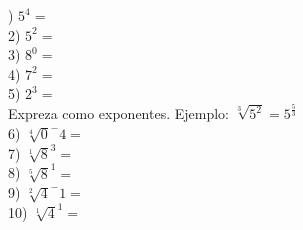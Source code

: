 \documentclass[a4paper,12pt]{article}
\begin{document}
 ) $5^4=$\vspace{1cm}\\ 
2) $5^2=$\vspace{1cm}\\ 
3) $8^0=$\vspace{1cm}\\ 
4) $7^2=$\vspace{1cm}\\ 
5) $2^3=$\vspace{1cm}\\ 
 Expreza como exponentes.
 Ejemplo: $\sqrt[3]{5^2}=5^\frac{5}{3} $  \vspace{0.5cm}\\ 
6) $\sqrt[4]{0}^-4=$\vspace{1cm}\\ 
7) $\sqrt[1]{8}^3=$\vspace{1cm}\\ 
8) $\sqrt[5]{8}^1=$\vspace{1cm}\\ 
9) $\sqrt[2]{4}^-1=$\vspace{1cm}\\ 
10) $\sqrt[1]{4}^1=$\vspace{1cm}\\ 

 \pagebreak 
\end{document}
